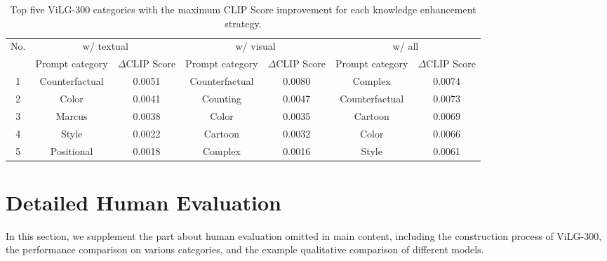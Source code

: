 \documentclass[10pt,twocolumn,letterpaper]{article}
\begin{document}
\begin{table*}[t]
  \small
  \centering
  \caption{Top five ViLG-300 categories with the maximum CLIP Score improvement for each knowledge enhancement strategy.}
    \begin{tabular}{ccccccc}
    \toprule
    \multicolumn{1}{c}{\multirow{2}[4]{*}{No.}} & \multicolumn{2}{c}{w/ textual} & \multicolumn{2}{c}{w/ visual} & \multicolumn{2}{c}{w/ all} \\
\cmidrule{2-7}    \multicolumn{1}{c}{} & Prompt category & \multicolumn{1}{c}{$\Delta$CLIP Score} & Prompt category & \multicolumn{1}{c}{$\Delta$CLIP Score} & Prompt category & $\Delta$CLIP Score \\
    \midrule
    1     & Counterfactual & 0.0051  & Counterfactual & 0.0080  & Complex & 0.0074  \\
    2     & Color  & 0.0041  & Counting & 0.0047  & Counterfactual & 0.0073  \\
    3     & Marcus & 0.0038  & Color  & 0.0035  & Cartoon & 0.0069  \\
    4     & Style & 0.0022  & Cartoon & 0.0032  & Color  & 0.0066  \\
    5     & Positional & 0.0018  & Complex & 0.0016  & Style & 0.0061  \\
    \bottomrule
    \end{tabular}\label{tab:vilg300-clip}\end{table*}



\section{Detailed Human Evaluation}\label{appx:human}

In this section, we supplement the part about human evaluation omitted in main content, including the construction process of ViLG-300, the performance comparison on various categories, and the example qualitative comparison of different models.
\end{document}

